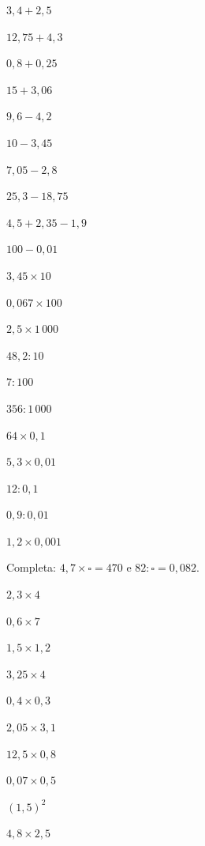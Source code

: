 \documentclass[12pt]{article}
\begin{document}


\begin{exercicios}
  \item $3{,}4 + 2{,}5$
  \item $12{,}75 + 4{,}3$
  \item $0{,}8 + 0{,}25$
  \item $15 + 3{,}06$
  \item $9{,}6 - 4{,}2$
  \item $10 - 3{,}45$
  \item $7{,}05 - 2{,}8$
  \item $25{,}3 - 18{,}75$
  \item $4{,}5 + 2{,}35 - 1{,}9$
  \item $100 - 0{,}01$
\end{exercicios}

\begin{exercicios}
  \item $3{,}45 \times 10$
  \item $0{,}067 \times 100$
  \item $2{,}5 \times 1\,000$
  \item $48{,}2 : 10$
  \item $7 : 100$
  \item $356 : 1\,000$
  \item $64 \times 0{,}1$
  \item $5{,}3 \times 0{,}01$
  \item $12 : 0{,}1$
  \item $0{,}9 : 0{,}01$
  \item $1{,}2 \times 0{,}001$
  \item Completa: $4{,}7 \times \square = 470$ \quad e \quad $82 : \square = 0{,}082$.
\end{exercicios}

\begin{exercicios}
  \item $2{,}3 \times 4$
  \item $0{,}6 \times 7$
  \item $1{,}5 \times 1{,}2$
  \item $3{,}25 \times 4$
  \item $0{,}4 \times 0{,}3$
  \item $2{,}05 \times 3{,}1$
  \item $12{,}5 \times 0{,}8$
  \item $0{,}07 \times 0{,}5$
  \item $(1{,}5)^2$
  \item $4{,}8 \times 2{,}5$
\end{exercicios}
\end{document}
